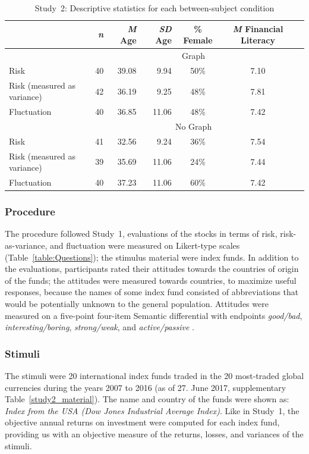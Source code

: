 \documentclass[a4paper,man, natbib,floatsintext]{apa6} %
\begin{document}
\begin{table}[ht]
\centering
\caption{Study~2: Descriptive statistics for each between-subject condition}
\label{tab:study2_subsample}
\begin{tabular}{lrrrccc}
\toprule
  & \textit{n} & \textit{M} Age & \textit{SD} Age & \% Female & \textit{M} Financial Literacy \\ 
    \toprule
    & \multicolumn{5}{c}{Graph}\\
   \cmidrule{2-6}
   Risk &  40 & 39.08 & 9.94 & 50\% & 7.10 \\ 
   Risk (measured as variance) &  42 & 36.19 & 9.25 & 48\% & 7.81 \\ 
   Fluctuation &  40 & 36.85 & 11.06 & 48\% & 7.42 \\ 
   \midrule
  & \multicolumn{5}{c}{No Graph}\\
  \cmidrule{2-6}
  Risk &  41 & 32.56 & 9.24 & 36\% & 7.54 \\ 
  Risk (measured as variance) &  39 & 35.69 & 11.06 & 24\% & 7.44 \\ 
  Fluctuation &  40 & 37.23 & 11.06 & 60\% & 7.42 \\ 
   \bottomrule
\end{tabular}
\end{table}

\subsubsection{Procedure}
The procedure followed Study~1, evaluations of the stocks in terms of risk, risk-as-variance, and fluctuation were measured on Likert-type scales (Table~\ref{table:Questions}); the stimulus material were index funds. In addition to the evaluations, participants rated their attitudes towards the countries of origin of the funds; the attitudes were measured towards countries, to maximize useful responses, because the names of some index fund consisted of abbreviations that would be potentially unknown to the general population. Attitudes were measured on a five-point four-item Semantic differential with endpoints \textit{good/bad}, \textit{interesting/boring}, \textit{strong/weak}, and \textit{active/passive} \citep{Kempf2014}.

\subsubsection{Stimuli}
The stimuli were 20 international index funds traded in the 20 most-traded global currencies during the years 2007 to 2016 (as of 27. June 2017, supplementary Table~\ref{study2_material}). The name and country of the funds were shown as: \textit{Index from the USA (Dow Jones Industrial Average Index)}. Like in Study~1, the objective annual returns on investment were computed for each index fund, providing us with an objective measure of the returns, losses, and variances of the stimuli.
\end{document}
